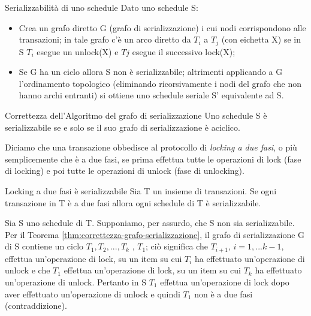 \begin{Algoritmo}{Serializzabilità di uno schedule}{}
    Dato uno schedule S:
    \begin{itemize}
        \item Crea un grafo diretto G (grafo di serializzazione) i cui nodi corrispondono alle transazioni; in tale grafo c'è un arco diretto da $T_i$ a $T_j$ (con eichetta X) se in S $T_i$ esegue un unlock(X) e $Tj$ esegue il successivo lock(X);
        \item Se G ha un ciclo allora S non è serializzabile; altrimenti applicando a G l'ordinamento topologico (eliminando ricorsivamente i nodi del grafo che non hanno archi entranti) si ottiene uno schedule seriale S' equivalente ad S.
    \end{itemize}
\end{Algoritmo}

\begin{Thm}{Correttezza dell'Algoritmo del grafo di serializzazione}{}\label{thm:correttezza-grafo-serializzazione}
    Uno schedule S è serializzabile se e solo se il suo grafo di serializzazione è aciclico.
\end{Thm}

Diciamo che una transazione obbedisce al protocollo di \textit{locking a due fasi}, o più semplicemente che è a due fasi, se prima effettua tutte le operazioni di lock (fase di locking) e poi tutte le operazioni di unlock (fase di unlocking).

\begin{Thm}{Locking a due fasi è serializzabile}{}
    Sia T un insieme di transazioni. Se ogni transazione in T è a due fasi allora ogni schedule di T è serializzabile.
    \begin{demonstration}
        Sia S uno schedule di T. Supponiamo, per assurdo, che S non sia serializzabile. Per il Teorema \ref{thm:correttezza-grafo-serializzazione}, il grafo di serializzazione G di S contiene un ciclo $T_1, T_2 ,..., T_k$ , $T_1$; ciò significa che $T_{i+1}$, $i=1,... k-1$, effettua un'operazione di lock, su un item su cui $T_i$ ha effettuato un'operazione di unlock e che $T_1$ effettua un'operazione di lock, su un item su cui $T_k$ ha effettuato un'operazione di unlock. Pertanto in S $T_1$ effettua un'operazione di lock dopo aver effettuato un'operazione di unlock e quindi $T_1$ non è a due fasi (contraddizione).
    \end{demonstration}
\end{Thm}

